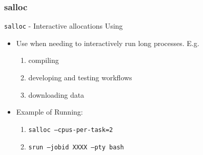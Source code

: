 \documentclass{beamer}
\newcommand{\code}[1]{\colorbox{codegray}{\texttt{#1}}}
\begin{document}
\begin{frame}
\frametitle{salloc}
\code{salloc} - Interactive allocations Using 
\bigskip
\begin{itemize}
    \item Use when needing to interactively run long processes. E.g.
        \begin{enumerate}
            \item compiling
            \bigskip
            \pause 
            \item developing and testing workflows
            \bigskip
            \pause 
            \item downloading data
            \bigskip
            \pause 
        \end{enumerate}
    \pause
    \item Example of Running:
    \bigskip
    \begin{enumerate}
        \item \code{salloc --cpus-per-task=2}
        \bigskip
        \item \code{srun  --jobid XXXX --pty bash}
    \end{enumerate}
\end{itemize}
\end{frame}
\end{document}
